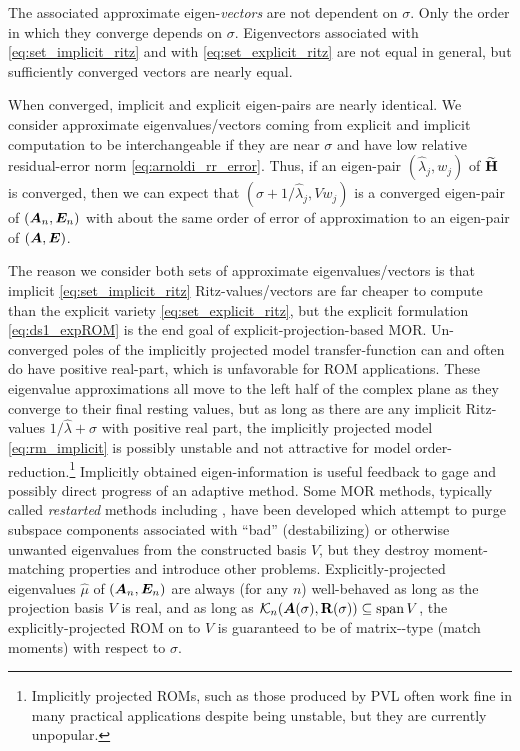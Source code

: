    The associated approximate eigen-\emph{vectors} are not dependent on $\sigma$.   Only the order in which they converge depends on $\sigma$.  Eigenvectors associated with  \eqref{eq:set_implicit_ritz} and with \eqref{eq:set_explicit_ritz} are not equal in general, but sufficiently converged vectors are nearly equal.

  When converged, implicit  and explicit  eigen-pairs are nearly identical. We consider approximate eigenvalues/vectors coming from explicit and implicit computation to be interchangeable if they are near $\sigma$ and have low relative residual-error norm \eqref{eq:arnoldi_rr_error}.   Thus, if an eigen-pair $(\hat{\lambda}_j,w_j)$ of $\widetilde{\textbf{\textup{H}}}$ is converged, then we can expect that $(\sigma+1/\hat{\lambda}_j,V w_j)$ is a converged eigen-pair of $(\bm{A}_n,\bm{E}_n)$ with about the same order of error of approximation to an eigen-pair of $(\bm{A},\bm{E})$.  

 The reason we consider both sets of approximate eigenvalues/vectors is that implicit \eqref{eq:set_implicit_ritz} Ritz-values/vectors are far cheaper to compute than the explicit variety \eqref{eq:set_explicit_ritz}, but the explicit formulation \eqref{eq:ds1_expROM} is the end goal of explicit-projection-based MOR.   Un-converged poles of the implicitly projected model transfer-function can and often do have positive real-part, which is unfavorable for ROM applications.  These eigenvalue approximations all move to the left half of the complex plane as they converge to their final resting  values, but as long as there are any implicit Ritz-values $1/\hat{\lambda}+\sigma$ with positive real part, the implicitly projected model \eqref{eq:rm_implicit} is possibly unstable and not attractive for model order-reduction.\footnote{Implicitly projected ROMs, such as those produced by PVL \cite{PVL} often work fine in many practical applications despite being unstable, but they are currently unpopular.}  Implicitly obtained eigen-information is useful feedback to gage and possibly direct progress of an adaptive method.  
Some MOR methods, typically called \emph{restarted} methods including 
\cite{grimme1996restart,papakos2003deflated,jaimoukha1997implicitMOR,ahmed2001implicit}, have been developed which attempt to purge subspace  components associated with ``bad'' (destabilizing) or otherwise unwanted eigenvalues from the constructed basis $V$, but they destroy moment-matching properties and introduce other problems.  Explicitly-projected eigenvalues $\hat{\mu}$ of $(\bm{A}_n,\bm{E}_n)$ are always (for any $n$) well-behaved as long as the projection basis $V$ is real, and as long as  $\mathcal{K}_{n}({\bm{A}(\sigma)},{\textbf{\textup{R}}(\sigma)})\subseteq \operatorname*{span} V$, the explicitly-projected ROM on to $V$ is guaranteed to be of matrix-\pade-type (match moments) with respect to $\sigma$.   

